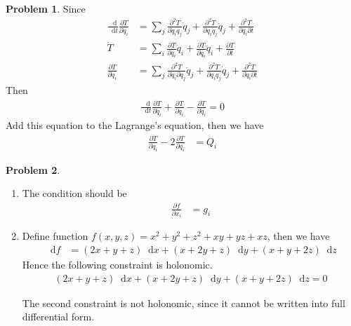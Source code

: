 \documentclass[twoside,11pt]{article}
\renewcommand*\d{\mathop{}\!\mathrm{d}}
\theoremstyle{definition}
\newtheorem{problem}{Problem}
\theoremstyle{remark}
\begin{document}
\begin{problem}
Since
\begin{align*}
    \frac{\d}{\d t}\frac{\partial T}{\partial\dot{q}_i} &= 
    \sum_j
    \frac{\partial^2 T}{\partial\dot{q}_i q_j}\dot{q}_j +
    \frac{\partial^2 T}{\partial\dot{q}_i \dot{q}_j}\ddot{q}_j
    + \frac{\partial^2 T}{\partial\dot{q}_i\partial t}\\
    \dot{T} &= \sum_i\frac{\partial T}{\partial q_i}\dot{q}_i
    + \frac{\partial T}{\partial\dot{q}_i}\ddot{q}_i
    + \frac{\partial T}{\partial t}\\
    \frac{\partial\dot{T}}{\partial\dot{q}_i} &=
    \sum_j\frac{\partial^2 T}{\partial\dot{q}_i\partial\dot{q}_j}\ddot{q}_j
    + \frac{\partial^2 T}{\partial\dot{q}_i q_j}\dot{q}_j
    + \frac{\partial^2 T}{\partial\dot{q}_i\partial t}
\end{align*}
Then
\begin{align*}
    \frac{\d}{\d t}\frac{\partial T}{\partial \dot{q}_i}
    + \frac{\partial T}{\partial q_i}
    - \frac{\partial\dot{T}}{\partial\dot{q}_i} 
    = 0
\end{align*}
Add this equation to the Lagrange's equation, then we have
\begin{align*}
    \frac{\partial\dot{T}}{\partial\dot{q}_i}
    - 2\frac{\partial T}{\partial q_i} &= Q_i
\end{align*}

\end{problem}


\begin{problem}\
\begin{enumerate}[label=(\alph*)]
\item The condition should be
\begin{align*}
    \frac{\partial f}{\partial x_i} &= 
    g_i
\end{align*}

\item Define function $f(x, y, z) = x^2+y^2+z^2+xy+yz+xz$, then we have
\begin{align*}
    \d f &= 
    (2x+y+z)\d x + (x+2y+z)\d y + (x+y+2z)\d z
\end{align*}
Hence the following constraint is holonomic.
\begin{align*}
    (2x+y+z)\d x + (x+2y+z)\d y + (x+y+2z)\d z = 0
\end{align*}

The second constraint is not holonomic, since it cannot be written 
into full differential form.

\end{enumerate}
\end{problem}
\end{document}
